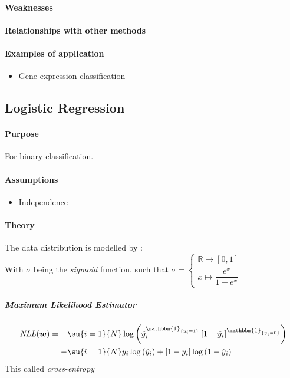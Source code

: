 \paragraph{Weaknesses}
\paragraph{Relationships with other methods}
\paragraph{Examples of application}
\begin{itemize}
    \item Gene expression classification
\end{itemize}


\subsection{Logistic Regression}
\paragraph{Purpose}
For binary classification. 
\paragraph{Assumptions}
\begin{itemize}
    \item Independence
\end{itemize}

\paragraph{Theory}
The data distribution is modelled by : 
\\
With $\sigma$ being the \emph{sigmoid} function, such that 
$\sigma = \begin{cases}
    \mathbb{R} \longrightarrow [0, 1]\\ 
    x \mapsto \dfrac{e^{x}}{1 + e^{x}}
\end{cases}
$
\subparagraph{Maximum Likelihood Estimator}
\begin{align*}
    \text{\emph{NLL}}(\bm{w})
    &= -\su{i=1}{N}\log\left(\hat{y}_{i}^{\mathbbm{1}_{\{y_{i} = 1\}}}\left[1 -
    \hat{y}_{i}\right]^{\mathbbm{1}_{\{y_{i}=0\}}}\right)\\ 
    &= -\su{i=1}{N}y_{i}\log\left(\hat{y}_{i}\right) + \left[1 -y_{i}\right]\log
    \left(1 -\hat{y}_{i}\right)
\end{align*}
This called \textit{cross-entropy}


